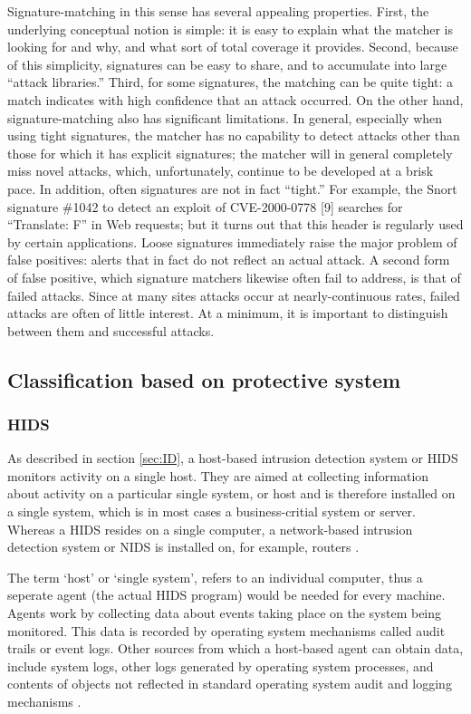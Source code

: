 Signature-matching in this sense has several appealing properties. First, the underlying conceptual notion is simple: it is easy to explain what the matcher is looking for and why, and what sort of total coverage it provides. Second, because of this simplicity, signatures can be easy to share, and to accumulate into large “attack libraries.” Third, for some signatures, the matching can be quite tight: a match indicates with high confidence that an attack occurred.
On the other hand, signature-matching also has significant limitations. In general, especially when using tight signatures, the matcher has no capability to detect attacks other than those for which it has explicit signatures; the matcher will in general completely miss novel attacks, which, unfortunately, continue to be developed at a brisk pace. In addition, often signatures are not in fact “tight.” For example, the Snort signature \#1042 to detect an exploit of CVE-2000-0778 [9] searches for “Translate: F” in Web
requests; but it turns out that this header is regularly used by certain applications. Loose signatures immediately raise the major problem of false positives: alerts that in fact do not reflect an actual attack. A second form of false positive, which signature matchers likewise
often fail to address, is that of failed attacks. Since at many sites attacks occur at nearly-continuous rates, failed attacks are often of little interest. At a minimum, it is important to distinguish between them and successful attacks.

\subsection{Classification based on protective system}

\subsubsection{HIDS}

As described in section \ref{sec:ID}, a host-based intrusion detection system or HIDS monitors activity on a single host. They are aimed at collecting information about activity on a particular single system, or host \citep{Host1} and is therefore installed on a single system, which is in most cases a business-critial system or server. Whereas a HIDS resides on a single computer, a network-based intrusion detection system or NIDS is installed on, for example, routers \citep{windowssecurity2}.

The term `host' or `single system', refers to an individual computer, thus a seperate agent (the actual HIDS program) would be needed for every machine. Agents work by collecting data about events taking place on the system being monitored. This data is recorded by operating system mechanisms called audit trails or event logs\citep{Host1, Host2}.  Other sources from which a host-based agent can obtain data, include system logs, other logs generated by operating system processes, and contents of objects not reflected in standard operating system audit and logging mechanisms \citep{Host1}.

